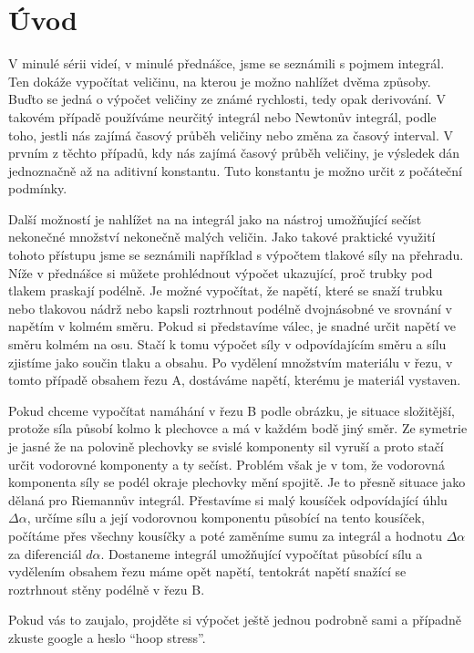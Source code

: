 \documentclass[12pt]{article}
\begin{document}
\section*{Úvod}

V minulé sérii videí, v minulé přednášce, jsme se seznámili s pojmem integrál. Ten dokáže vypočítat veličinu, na kterou je možno nahlížet dvěma způsoby. Buďto se jedná o výpočet veličiny ze známé rychlosti, tedy opak derivování. V takovém případě používáme neurčitý integrál nebo Newtonův integrál, podle toho, jestli nás zajímá časový průběh veličiny nebo změna za časový interval. V prvním z těchto případů, kdy nás zajímá časový průběh veličiny, je výsledek dán jednoznačně až na aditivní konstantu. Tuto konstantu je možno určit z počáteční podmínky.

Další možností je nahlížet na na integrál jako na nástroj umožňující sečíst nekonečné množství nekonečně malých veličin. Jako takové praktické využití tohoto přístupu jsme se seznámili například s výpočtem tlakové síly na přehradu. Níže v přednášce si můžete prohlédnout výpočet ukazující, proč trubky pod tlakem praskají podélně. Je možné vypočítat, že napětí, které se snaží trubku nebo tlakovou nádrž nebo kapsli roztrhnout podélně dvojnásobné ve srovnání v napětím v kolmém směru. Pokud si představíme válec, je snadné určit napětí ve směru kolmém na osu. Stačí k tomu výpočet síly v odpovídajícím směru a sílu zjistíme jako součin tlaku a obsahu. Po vydělení množstvím materiálu v řezu, v tomto případě obsahem řezu A, dostáváme napětí, kterému je materiál vystaven.

Pokud chceme vypočítat namáhání v řezu B podle obrázku, je situace složitější, protože síla působí kolmo k plechovce a má v každém bodě jiný směr. Ze symetrie je jasné že na polovině plechovky se svislé komponenty sil vyruší a proto stačí určit vodorovné komponenty a ty sečíst. Problém však je v tom, že vodorovná komponenta síly se podél okraje plechovky mění spojitě. Je to přesně situace jako dělaná pro Riemannův integrál. Přestavíme si malý kousíček odpovídající úhlu $\Delta \alpha$, určíme sílu a její vodorovnou komponentu působící na tento kousíček, počítáme přes všechny kousíčky a poté zaměníme sumu za integrál a hodnotu $\Delta \alpha$ za diferenciál $d\alpha$. Dostaneme integrál umožňující vypočítat působící sílu a vydělením obsahem řezu máme opět napětí, tentokrát napětí snažící se roztrhnout stěny podélně v řezu B.

Pokud vás to zaujalo, projděte si výpočet ještě jednou podrobně sami a případně zkuste google a heslo ``hoop stress''.
\end{document}
